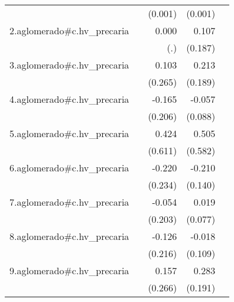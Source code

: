 {\begin{longtable}{l*{4}{D{.}{.}{-1}}}
            &                     &     (0.001)         &     (0.001)         &                     \\
\addlinespace
2.aglomerado#c.hv\_precaria&                     &       0.000         &       0.107         &                     \\
            &                     &         (.)         &     (0.187)         &                     \\
\addlinespace
3.aglomerado#c.hv\_precaria&                     &       0.103         &       0.213         &                     \\
            &                     &     (0.265)         &     (0.189)         &                     \\
\addlinespace
4.aglomerado#c.hv\_precaria&                     &      -0.165         &      -0.057         &                     \\
            &                     &     (0.206)         &     (0.088)         &                     \\
\addlinespace
5.aglomerado#c.hv\_precaria&                     &       0.424         &       0.505         &                     \\
            &                     &     (0.611)         &     (0.582)         &                     \\
\addlinespace
6.aglomerado#c.hv\_precaria&                     &      -0.220         &      -0.210         &                     \\
            &                     &     (0.234)         &     (0.140)         &                     \\
\addlinespace
7.aglomerado#c.hv\_precaria&                     &      -0.054         &       0.019         &                     \\
            &                     &     (0.203)         &     (0.077)         &                     \\
\addlinespace
8.aglomerado#c.hv\_precaria&                     &      -0.126         &      -0.018         &                     \\
            &                     &     (0.216)         &     (0.109)         &                     \\
\addlinespace
9.aglomerado#c.hv\_precaria&                     &       0.157         &       0.283         &                     \\
            &                     &     (0.266)         &     (0.191)         &                     \\

\end{longtable}}
